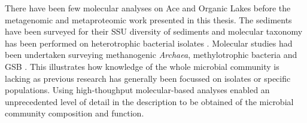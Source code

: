 There have been few molecular analyses on Ace and Organic Lakes before the metagenomic and metaproteomic work presented in this thesis.
The sediments have been surveyed for their \ac{SSU} diversity of sediments \cite{Bowman2000a, Bowman2000b} and molecular taxonomy has been performed on heterotrophic bacterial isolates \cite{VanTrappen2002}.
Molecular studies had been undertaken surveying methanogenic \emph{Archaea}, methylotrophic bacteria and \ac{GSB} \cite{Coolen2004a, Coolen2004b, Coolen2006}.
This illustrates how knowledge of the whole microbial community is lacking as previous research has generally been focussed on isolates or specific populations.
Using high-thoughput molecular-based analyses enabled an unprecedented level of detail in the description to be obtained of the microbial community composition and function.

